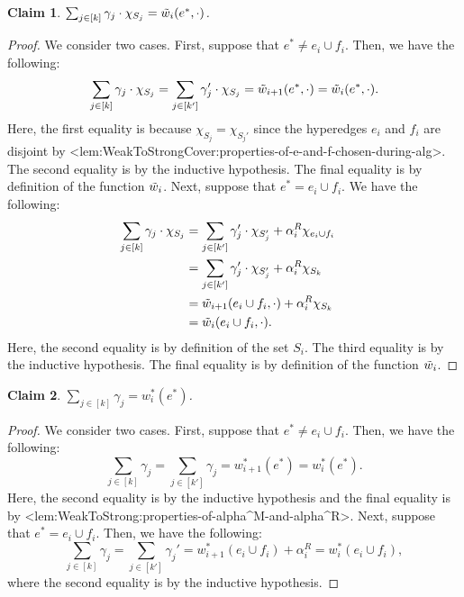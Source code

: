 \documentclass{article}
\def\Cref#1{<#1>}%
\newtheorem{claim}{Claim}[section]
\begin{document}
\begin{claim}\label{claim:weak-to-strong:correctness:main:hyperedge-merge:property3}
     $\sum_{j \in [k]}\gamma_j\cdot \chi_{S_j} = \Tilde{w}_i(e^*, \cdot)$.
\end{claim}
\begin{proof}
    We consider two cases. First, suppose that $e^* \not = e_i\cup f_i$. Then, we have the following:
    $$\sum_{j \in [k]}\gamma_j\cdot \chi_{S_j} = \sum_{j \in [k']}\gamma_j'\cdot \chi_{S_j} = \Tilde{w}_{i+1}(e^*, \cdot) = \Tilde{w}_i(e^*, \cdot).$$
    Here, the first equality is because $\chi_{S_j} = \chi_{S_j'}$ since the hyperedges $e_i$ and $f_i$ are disjoint by \Cref{lem:WeakToStrongCover:properties-of-e-and-f-chosen-during-alg}. The second equality is by the inductive hypothesis. The final equality is by definition of the function $\Tilde{w}_i$. Next, suppose that $e^* = e_i\cup f_i$. We have the following:
    \begin{align*}
        \sum_{j \in [k]}\gamma_j\cdot \chi_{S_j}& = \sum_{j \in [k']}\gamma_j'\cdot \chi_{S_j'} + \alpha_i^R\chi_{e_i\cup f_i} &\\
        &= \sum_{j \in [k']}\gamma_j'\cdot \chi_{S_j'} + \alpha_i^R\chi_{S_k}&\\
        &= \Tilde{w}_{i+1}(e_i\cup f_i, \cdot) + \alpha_i^R\chi_{S_k}&\\
        &= \Tilde{w}_i(e_i\cup f_i, \cdot).&
    \end{align*}
    Here, the second equality is by definition of the set $S_i$. The third equality is by the inductive hypothesis. The final equality is by definition of the function $\Tilde{w}_i$.
\end{proof}

\begin{claim}\label{claim:weak-to-strong:correctness:main:hyperedge-merge:property4}
    $\sum_{j \in [k]}\gamma_j = w_i^*(e^*)$.
\end{claim}
\begin{proof}
    We consider two cases. First, suppose that $e^* \not = e_i\cup f_i$. Then, we have the following:
    $$\sum_{j \in [k]}\gamma_j = \sum_{j \in [k']}\gamma_j = w^*_{i+1}(e^*) = w_i^*(e^*).$$
    Here, the second equality is by the inductive hypothesis and the final equality is by \Cref{lem:WeakToStrong:properties-of-alpha^M-and-alpha^R}. Next, suppose that $e^* = e_i \cup f_i$. Then, we have the following:
    $$\sum_{j \in [k]}\gamma_j = \sum_{j \in [k']}\gamma_j' = w^*_{i+1}(e_i\cup f_i) + \alpha_i^R= w_i^*(e_i\cup f_i),$$
    where the second equality is by the inductive hypothesis.
\end{proof}
\fi
\end{document}
